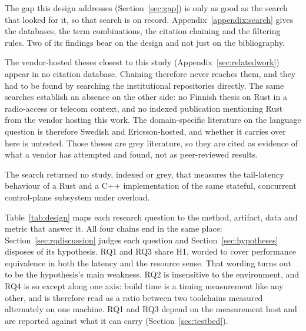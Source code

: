 \documentclass[english,oneside,a4paper,censored,csm,software-track-2020]{HYthesisML}
\begin{document}
The gap this design addresses (Section~\ref{sec:gap}) is only as good as the search that looked
for it, so that search is on record. Appendix~\ref{appendix:search} gives the databases, the term
combinations, the citation chaining and the filtering rules. Two of its findings bear on the
design and not just on the bibliography.

The vendor-hosted theses closest to this study (Appendix~\ref{sec:relatedwork}) appear in no
citation database. Chaining therefore never reaches them, and they had to be found by searching
the institutional repositories directly. The same searches establish an absence on the other
side: no Finnish thesis on Rust in a radio-access or telecom context, and no indexed publication
mentioning Rust from the vendor hosting this work. The domain-specific literature on the
language question is therefore Swedish and Ericsson-hosted, and whether it carries over here is
untested. Those theses are grey literature, so they are cited as evidence of what a vendor has
attempted and found, not as peer-reviewed results.

The search returned no study, indexed or grey, that measures the tail-latency behaviour of a
Rust and a C++ implementation of the same stateful, concurrent control-plane subsystem under
overload.

Table~\ref{tab:design} maps each research question to the method, artifact, data and metric that
answer it. All four chains end in the same place: Section~\ref{sec:rqdiscussion} judges each
question and Section~\ref{sec:hypotheses} disposes of its hypothesis. RQ1 and RQ3 share H1,
worded to cover performance equivalence in both the latency and the resource sense. That wording
turns out to be the hypothesis's main weakness. RQ2 is insensitive to the environment, and RQ4 is
so except along one axis: build time is a timing measurement like any other, and is therefore read
as a ratio between two toolchains measured alternately on one machine. RQ1 and RQ3 depend on the
measurement host and are reported against what it can carry (Section~\ref{sec:testbed}).
\end{document}
